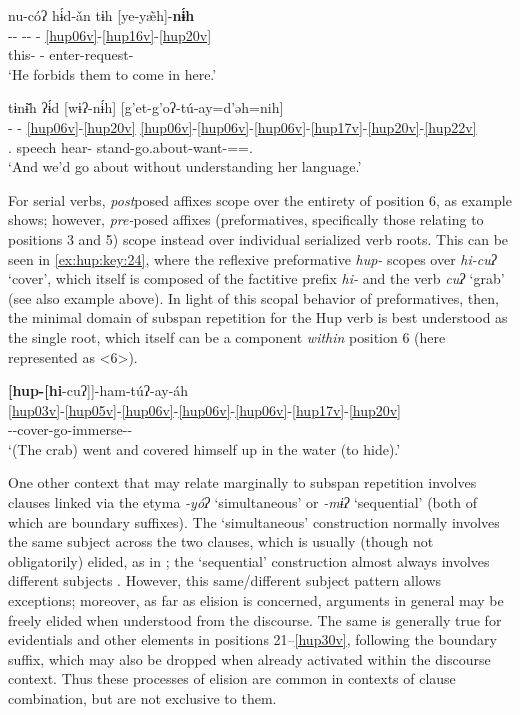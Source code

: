 \documentclass[output=paper]{langscibook}
\begin{document}
\ea\label{ex:hup:key:22}
\glll nu-cóʔ hɨ́d-ǎn tɨh [ye-y\~{æ}h]-\textbf{nɨ́h}\\ 
-{}- -{}- - \ref{hup06v}-\ref{hup16v}-\ref{hup20v}\\
this-\Loc{} \Third\Pl-\Obj{} \Third\Sg{} enter-request-\Neg{}\\ 
\glt `He forbids them to come in here.'
\z 

\ea\label{ex:hup:key:23} 
\glll tɨnɨ̌h ʔɨ́d [wɨʔ-n\'ɨh] [g'et-g'oʔ-tú-ay=d'ǝh=nih]\\ 
- - \ref{hup06v}-\ref{hup20v} \ref{hup06v}-\ref{hup06v}-\ref{hup06v}-\ref{hup17v}-\ref{hup20v}-\ref{hup22v}\\ 
\Third\Sg.\Poss{} speech hear-\Neg{} stand-go.about-want-\Inch=\Pl=\Emph.\Co{}\\ 
\glt `And we'd go about without understanding her language.'
\z 

For serial verbs, \textit{post}posed affixes scope over the entirety of position 6, as example  shows; however, \textit{pre-}posed affixes (preformatives, specifically those relating to positions 3 and 5) scope instead over individual serialized verb roots. This can be seen in \ref{ex:hup:key:24}, where the reflexive preformative \textit{hup-} scopes over \textit{hi-cuʔ} `cover', which itself is composed of the factitive prefix \textit{hi-} and the verb \textit{cuʔ} `grab' (see also example  above). In light of this scopal behavior of preformatives, then, the minimal domain of subspan repetition for the Hup verb is best understood as the single root, which itself can be a component \textit{within} position 6 (here represented as <6>).

\ea\label{ex:hup:key:24} 
\glll \textbf{[hup-[hi}-cuʔ]]-ham-túʔ-ay-áh\\ 
\ref{hup03v}-\ref{hup05v}-\ref{hup06v}-\ref{hup06v}-\ref{hup06v}-\ref{hup17v}-\ref{hup20v}\\ 
\Refl-\Fact{}-cover-go-immerse-\Inch{}-\Decl{}\\ 
\glt `(The crab) went and covered himself up in the water (to hide).'
\z 

One other context that may relate marginally to subspan repetition involves clauses linked via the etyma \textit{-yóʔ} `simultaneous' or \textit{-mɨʔ} `sequential' (both of which are boundary suffixes). The `simultaneous' construction normally involves the same subject across the two clauses, which is usually (though not obligatorily) elided, as in ; the `sequential' construction almost always involves different subjects . However, this same/different subject pattern allows exceptions; moreover, as far as elision is concerned, arguments in general may be freely elided when understood from the discourse. The same is generally true for evidentials and other elements in positions 21–\ref{hup30v}, following the boundary suffix, which may also be dropped when already activated within the discourse context. Thus these processes of elision are common in contexts of clause combination, but are not exclusive to them.
\end{document}
